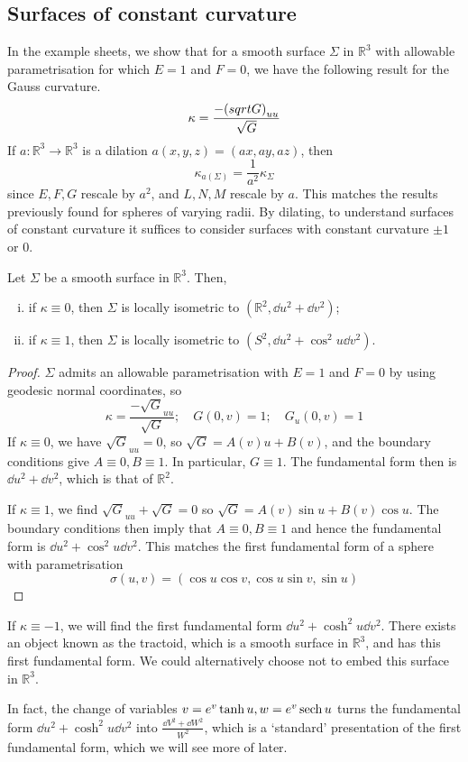 \subsection{Surfaces of constant curvature}
In the example sheets, we show that for a smooth surface \( \Sigma \) in \( \mathbb R^3 \) with allowable parametrisation for which \( E = 1 \) and \( F = 0 \), we have the following result for the Gauss curvature.
\[ \kappa = \frac{-\qty(sqrt{G})_{uu}}{\sqrt{G}} \]
If \( a \colon \mathbb R^3 \to \mathbb R^3 \) is a dilation \( a(x,y,z) = (ax,ay,az) \), then
\[ \kappa_{a(\Sigma)} = \frac{1}{a^2} \kappa_\Sigma \]
since \( E, F, G \) rescale by \( a^2 \), and \( L, N, M \) rescale by \( a \).
This matches the results previously found for spheres of varying radii.
By dilating, to understand surfaces of constant curvature it suffices to consider surfaces with constant curvature \( \pm 1 \) or 0.
\begin{proposition}
	Let \( \Sigma \) be a smooth surface in \( \mathbb R^3 \).
	Then,
	\begin{enumerate}[(i)]
		\item if \( \kappa \equiv 0 \), then \( \Sigma \) is locally isometric to \( (\mathbb R^2, \dd{u^2} + \dd{v}^2) \);
		\item if \( \kappa \equiv 1 \), then \( \Sigma \) is locally isometric to \( (S^2, \dd{u}^2 + \cos^2 u \dd{v}^2) \).
	\end{enumerate}
\end{proposition}
\begin{proof}
	\( \Sigma \) admits an allowable parametrisation with \( E = 1 \) and \( F = 0 \) by using geodesic normal coordinates, so
	\[ \kappa = \frac{-\sqrt{G}_{uu}}{\sqrt{G}};\quad G(0,v) = 1;\quad G_u(0,v) = 1 \]
	If \( \kappa \equiv 0 \), we have \( \sqrt{G}_{uu} = 0 \), so \( \sqrt{G} = A(v) u + B(v) \), and the boundary conditions give \( A \equiv 0, B \equiv 1 \).
	In particular, \( G \equiv 1 \).
	The fundamental form then is \( \dd{u}^2 + \dd{v}^2 \), which is that of \( \mathbb R^2 \).

	If \( \kappa \equiv 1 \), we find \( \sqrt{G}_{uu} + \sqrt{G} = 0 \) so \( \sqrt{G} = A(v) \sin u + B(v) \cos u \).
	The boundary conditions then imply that \( A \equiv 0, B \equiv 1 \) and hence the fundamental form is \( \dd{u}^2 + \cos^2 u \dd{v}^2 \).
	This matches the first fundamental form of a sphere with parametrisation
	\[ \sigma(u,v) = (\cos u \cos v, \cos u \sin v, \sin u) \]
\end{proof}
\begin{remark}
	If \( \kappa \equiv -1 \), we will find the first fundamental form \( \dd{u}^2 + \cosh^2 u \dd{v}^2 \).
	There exists an object known as the tractoid, which is a smooth surface in \( \mathbb R^3 \), and has this first fundamental form.
	We could alternatively choose not to embed this surface in \( \mathbb R^3 \).

	In fact, the change of variables \( v = e^v \tanh u, w = e^v \sech u \) turns the fundamental form \( \dd{u}^2 + \cosh^2 u \dd{v}^2 \) into \( \frac{\dd{V}^2 + \dd{W}^2}{W^2} \), which is a `standard' presentation of the first fundamental form, which we will see more of later.
\end{remark}
